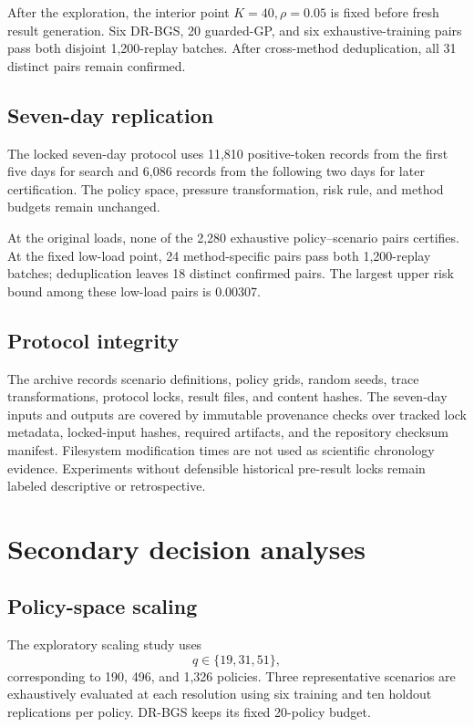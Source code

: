 \documentclass[futureinternet,supfile,submit,moreauthors]{Definitions/mdpi}
\begin{document}
After the exploration, the interior point \(K=40,\rho=0.05\) is fixed before
fresh result generation. Six DR-BGS, 20 guarded-GP, and six
exhaustive-training pairs pass both disjoint 1,200-replay batches. After
cross-method deduplication, all 31 distinct pairs remain confirmed.

\subsection{Seven-day replication}

The locked seven-day protocol uses 11,810 positive-token records from the
first five days for search and 6,086 records from the following two days for
later certification. The policy space, pressure transformation, risk rule,
and method budgets remain unchanged.

At the original loads, none of the 2,280 exhaustive policy--scenario pairs
certifies. At the fixed low-load point, 24 method-specific pairs pass both
1,200-replay batches; deduplication leaves 18 distinct confirmed pairs. The
largest upper risk bound among these low-load pairs is 0.00307.

\subsection{Protocol integrity}

The archive records scenario definitions, policy grids, random seeds, trace
transformations, protocol locks, result files, and content hashes. The
seven-day inputs and outputs are covered by immutable provenance checks over
tracked lock metadata, locked-input hashes, required artifacts, and the
repository checksum manifest. Filesystem modification times are not used as
scientific chronology evidence. Experiments without defensible historical
pre-result locks remain labeled descriptive or retrospective.

\section{Secondary decision analyses}
\label{sec:secondary}

\subsection{Policy-space scaling}

The exploratory scaling study uses
\[
q\in\{19,31,51\},
\]
corresponding to 190, 496, and 1,326 policies. Three representative scenarios
are exhaustively evaluated at each resolution using six training and ten
holdout replications per policy. DR-BGS keeps its fixed 20-policy budget.
\end{document}

